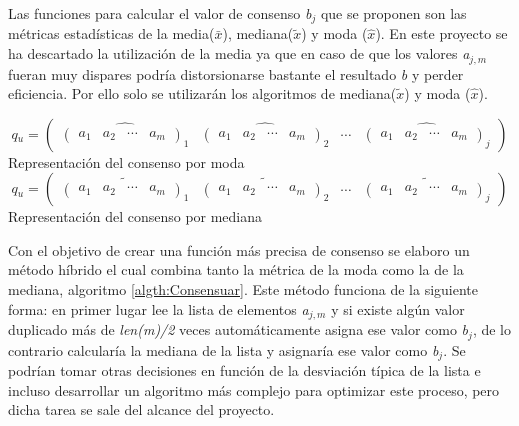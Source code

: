 Las funciones para calcular el valor de consenso \textit{b$_{j}$} que se proponen son las métricas estadísticas de la media(\(\bar{x}\)), mediana(\(\tilde{x}\)) y moda (\(\hat{x}\)). En este proyecto se ha descartado la utilización de la media ya que en caso de que los valores \textit{a$_{j, m}$} fueran muy dispares podría distorsionarse bastante el resultado \textit{b} y perder eficiencia. Por ello solo se utilizarán los algoritmos de mediana(\(\tilde{x}\)) y moda (\(\hat{x}\)).
\begin{center}
    \[  \textit{q$_{u}$} = 
        \begin{pmatrix}
            \widehat{ \begin{pmatrix} a_{1}  &  a_{2}  &  \cdots   & a_{m} \end{pmatrix}_{1}} & 
            \widehat{ \begin{pmatrix} a_{1}  &  a_{2}  &  \cdots   & a_{m} \end{pmatrix}_{2}}& 
            \cdots & 
            \widehat{ \begin{pmatrix} a_{1}  &  a_{2}  &  \cdots   & a_{m} \end{pmatrix}_{j}}
        \end{pmatrix}
    \]
    Representación del consenso por moda
    \\
    \[  \textit{q$_{u}$} = 
        \begin{pmatrix}
            \widetilde{ \begin{pmatrix} a_{1}  &  a_{2}  &  \cdots   & a_{m} \end{pmatrix}_{1}} & 
            \widetilde{ \begin{pmatrix} a_{1}  &  a_{2}  &  \cdots   & a_{m} \end{pmatrix}_{2}}& 
            \cdots & 
            \widetilde{ \begin{pmatrix} a_{1}  &  a_{2}  &  \cdots   & a_{m} \end{pmatrix}_{j}}
        \end{pmatrix}
    \]
    Representación del consenso por mediana
\end{center}    
Con el objetivo de crear una función más precisa de consenso se elaboro un método híbrido el cual combina tanto la métrica de la moda como la de la mediana, algoritmo \ref{algth:Consensuar}. Este método funciona de la siguiente forma: en primer lugar lee la lista de elementos \textit{a$_{j, m}$} y si existe algún valor duplicado más de \textit{len(m)/2} veces automáticamente asigna ese valor como \textit{b$_{j}$}, de lo contrario calcularía la mediana de la lista y asignaría ese valor como \textit{b$_{j}$}. Se podrían tomar otras decisiones en función de la desviación típica de la lista e incluso desarrollar un algoritmo más complejo para optimizar este proceso, pero dicha tarea se sale del alcance del proyecto.
